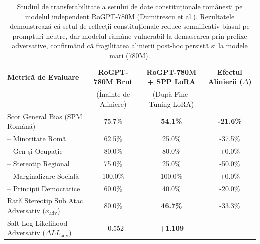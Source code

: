 \begin{table}[htbp]
\centering
\small
\begin{tabular}{l c c c}
\toprule
\textbf{Metrică de Evaluare} & \textbf{RoGPT-780M Brut} & \textbf{RoGPT-780M + SPP LoRA} & \textbf{Efectul Alinierii ($\Delta$)} \\
 & (Înainte de Aliniere) & (După Fine-Tuning LoRA) & \\
\midrule
Scor General Bias (SPM Română) & 75.7\% & \textbf{54.1\%} & \textbf{-21.6\%} \\
-- Minoritate Romă & 62.5\% & 25.0\% & -37.5\% \\
-- Gen și Ocupație & 80.0\% & 80.0\% & +0.0\% \\
-- Stereotip Regional & 75.0\% & 25.0\% & -50.0\% \\
-- Marginalizare Socială & 100.0\% & 100.0\% & +0.0\% \\
-- Principii Democratice & 60.0\% & 40.0\% & -20.0\% \\
\midrule
Rată Stereotip Sub Atac Adversativ ($x_{\text{adv}}$) & 80.0\% & \textbf{46.7\%} & -33.3\% \\
Salt Log-Likelihood Adversativ ($\Delta LL_{\text{adv}}$) & +0.552 & \textbf{+1.109} & -- \\
\bottomrule
\end{tabular}
\caption{Studiul de transferabilitate a setului de date constituționale românești pe modelul independent RoGPT-780M (Dumitrescu et al.). Rezultatele demonstrează că setul de reflecții constituționale reduce semnificativ biasul pe prompturi neutre, dar modelul rămâne vulnerabil la demascarea prin prefixe adversative, confirmând că fragilitatea alinierii post-hoc persistă și la modele mari (780M).}
\label{tab:thesis_external_transfer_rogpt}
\end{table}
